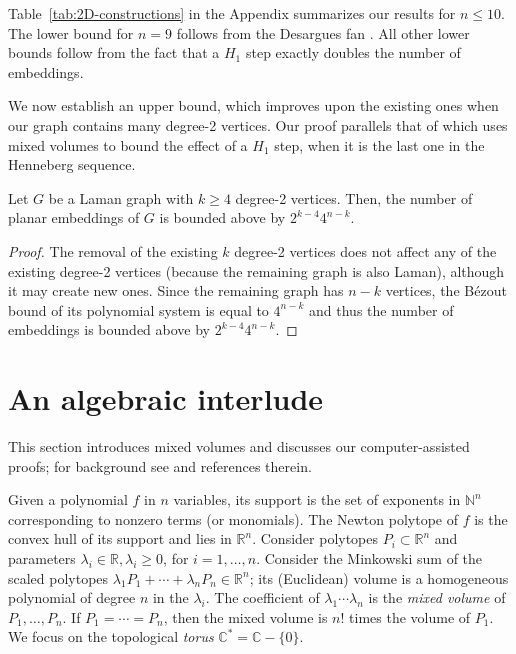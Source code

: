 \documentclass[envcountsame]{llncs}
\def\CC{{\mathbb C}} \def\NN{{\mathbb N}} \def\RR{{\mathbb R}}
\begin{document}
Table~\ref{tab:2D-constructions} in the Appendix summarizes our results for $n\le 10$.
The lower bound for $n= 9$ 
follows from  the Desargues fan \cite{BS04}. All other lower bounds follow  from   the fact that a $H_1$ step exactly doubles the number of embeddings.


We now establish an  upper bound, which improves upon the existing ones when our 
graph  contains many degree-2 vertices.
Our proof parallels that of \cite{ST08} which uses mixed volumes to bound the effect
of a $H_1$ step, when it is the last one in the Henneberg sequence.

\begin{lemma}\label{Lsparse2}
  Let $G$ be a Laman graph with  $k \ge 4$ degree-2 vertices.
  Then, the number of planar embeddings of $G$ is bounded above by $2^{k-4}     4^{n-k}$.
\end{lemma}

\begin{proof}
The removal of the existing $k$ degree-2 vertices  does not affect any of the existing degree-2 vertices (because the
  remaining graph  is also Laman), although it may create new ones.
  Since the remaining graph has $n-k$ vertices, the B\'ezout bound of its
polynomial system is equal to $4^{n-k}$ and thus  the number of
embeddings is bounded above by    $2^{k-4} 4^{n-k}$.
\end{proof}



\section{An algebraic interlude} \label{sec:abid}

This section introduces mixed volumes and discusses our computer-assisted proofs;
for background see \cite{B75,EmCa95} and references therein.

Given a polynomial $f$ in $n$ variables, its support is the set of exponents
in $\NN^n$ corresponding to nonzero terms (or monomials).
The Newton polytope of $f$ is the convex hull of its support and lies in $\RR^n$.
Consider polytopes $P_i\subset\RR^n$ and parameters $\lambda_i\in\RR, \lambda_i\ge 0$, for $i=1,\dots,n$.
Consider the Minkowski sum of the scaled polytopes
$\lambda_1 P_1+\cdots+\lambda_nP_n \in\RR^n$;
its (Euclidean) volume is a homogeneous polynomial of degree $n$ in the $\lambda_i$.
The coefficient of $\lambda_1\cdots \lambda_n$ is the
{\em mixed volume} of $P_1,\ldots,P_n$.
If $P_1 = \cdots =P_n$, then the mixed volume is $n!$ times the volume of $P_1$.
We focus on the topological {\em torus} $\CC^*=\CC-\{0\}$.
 
\end{document}
